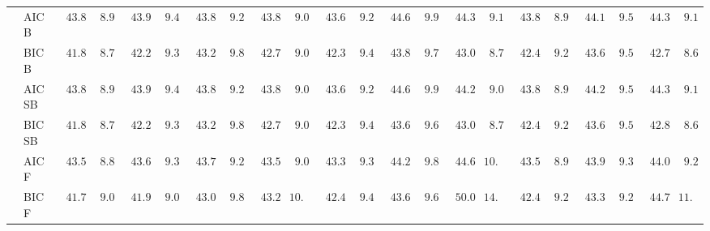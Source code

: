 \begin{tabular}{ll|ll|llllll|llllll|llllll}
 & AIC B  & $\phantom{0}43.85$ & $\phantom{0}8.96$ & $\phantom{0}43.95$ & $\phantom{0}9.48$ & $\phantom{0}43.82$ & $\phantom{0}9.22$ & $\phantom{0}43.84$ & $\phantom{0}9.07$ & $\phantom{0}43.65$ & $\phantom{0}9.20$ & $\phantom{0}44.63$ & $\phantom{0}9.96$ & $\phantom{0}44.35$ & $\phantom{0}9.13$ & $\phantom{0}43.87$ & $\phantom{0}8.99$ & $\phantom{0}44.19$ & $\phantom{0}9.55$ & $\phantom{0}44.39$ & $\phantom{0}9.15$ \\
 & BIC B  & $\phantom{0}41.89$ & $\phantom{0}8.76$ & $\phantom{0}42.23$ & $\phantom{0}9.31$ & $\phantom{0}43.26$ & $\phantom{0}9.81$ & $\phantom{0}42.74$ & $\phantom{0}9.03$ & $\phantom{0}42.35$ & $\phantom{0}9.46$ & $\phantom{0}43.82$ & $\phantom{0}9.74$ & $\phantom{0}43.05$ & $\phantom{0}8.76$ & $\phantom{0}42.49$ & $\phantom{0}9.20$ & $\phantom{0}43.66$ & $\phantom{0}9.56$ & $\phantom{0}42.75$ & $\phantom{0}8.60$ \\
 & AIC SB  & $\phantom{0}43.85$ & $\phantom{0}8.96$ & $\phantom{0}43.93$ & $\phantom{0}9.44$ & $\phantom{0}43.83$ & $\phantom{0}9.23$ & $\phantom{0}43.84$ & $\phantom{0}9.07$ & $\phantom{0}43.65$ & $\phantom{0}9.20$ & $\phantom{0}44.63$ & $\phantom{0}9.96$ & $\phantom{0}44.29$ & $\phantom{0}9.00$ & $\phantom{0}43.87$ & $\phantom{0}8.99$ & $\phantom{0}44.27$ & $\phantom{0}9.50$ & $\phantom{0}44.39$ & $\phantom{0}9.15$ \\
 & BIC SB  & $\phantom{0}41.89$ & $\phantom{0}8.76$ & $\phantom{0}42.25$ & $\phantom{0}9.30$ & $\phantom{0}43.26$ & $\phantom{0}9.81$ & $\phantom{0}42.74$ & $\phantom{0}9.03$ & $\phantom{0}42.35$ & $\phantom{0}9.46$ & $\phantom{0}43.67$ & $\phantom{0}9.69$ & $\phantom{0}43.05$ & $\phantom{0}8.76$ & $\phantom{0}42.49$ & $\phantom{0}9.20$ & $\phantom{0}43.66$ & $\phantom{0}9.56$ & $\phantom{0}42.80$ & $\phantom{0}8.67$ \\
 & AIC F  & $\phantom{0}43.53$ & $\phantom{0}8.89$ & $\phantom{0}43.69$ & $\phantom{0}9.35$ & $\phantom{0}43.76$ & $\phantom{0}9.24$ & $\phantom{0}43.58$ & $\phantom{0}9.04$ & $\phantom{0}43.31$ & $\phantom{0}9.37$ & $\phantom{0}44.28$ & $\phantom{0}9.82$ & $\phantom{0}44.62$ & $10.52$ & $\phantom{0}43.53$ & $\phantom{0}8.95$ & $\phantom{0}43.99$ & $\phantom{0}9.33$ & $\phantom{0}44.00$ & $\phantom{0}9.25$ \\
 & BIC F  & $\phantom{0}41.72$ & $\phantom{0}9.09$ & $\phantom{0}41.98$ & $\phantom{0}9.00$ & $\phantom{0}43.00$ & $\phantom{0}9.87$ & $\phantom{0}43.25$ & $10.50$ & $\phantom{0}42.43$ & $\phantom{0}9.41$ & $\phantom{0}43.60$ & $\phantom{0}9.63$ & $\phantom{0}50.08$ & $14.76$ & $\phantom{0}42.46$ & $\phantom{0}9.20$ & $\phantom{0}43.30$ & $\phantom{0}9.25$ & $\phantom{0}44.70$ & $11.92$ \\

\end{tabular}
